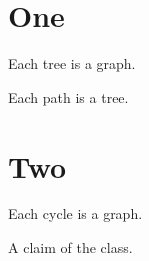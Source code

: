 \documentclass[envcountsame,envcountsect]{svmult}
\begin{document}
\section{One}
\begin{theorem} Each tree is a graph. \end{theorem}
\begin{lemma} Each path is a tree. \end{lemma}
\section{Two}
\begin{remark} Each cycle is a graph. \end{remark}
\begin{claim} A claim of the class. \end{claim}
\end{document}
